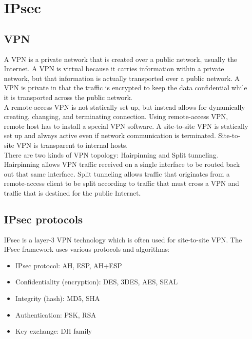 \chapter{IPsec}

\section{VPN}

A VPN is a private network that is created over a public network, usually the Internet. A VPN is virtual because it carries information within a private network, but that information is actually transported over a public network. A VPN is private in that the traffic is encrypted to keep the data confidential while it is transported across the public network.\\

A remote-access VPN is not statically set up, but instead allows for dynamically creating, changing, and terminating connection. Using remote-access VPN, remote host has to install a special VPN software. A site-to-site VPN is statically set up and always active even if network communication is terminated. Site-to-site VPN is transparent to internal hosts.\\

There are two kinds of VPN topology: Hairpinning and Split tunneling. Hairpinning allows VPN traffic received on a single interface to be routed back out that same interface. Split tunneling allows traffic that originates from a remote-access client to be split according to traffic that must cross a VPN and traffic that is destined for the public Internet. 

\section{IPsec protocols}

IPsec is a layer-3 VPN technology which is often used for site-to-site VPN. The IPsec framework uses various protocols and algorithms:

\begin{itemize}
\item IPsec protocol: AH, ESP, AH+ESP
\item Confidentiality (encryption): DES, 3DES, AES, SEAL
\item Integrity (hash): MD5, SHA
\item Authentication: PSK, RSA
\item Key exchange: DH family
\end{itemize}

